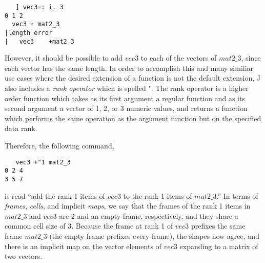 \begin{verbatim}
   ] vec3=: i. 3
0 1 2
  vec3 + mat2_3
|length error
|   vec3    +mat2_3
\end{verbatim}

However, it should be possible to add $vec3$ to each of the vectors of $mat2\_3$, since each vector has the same length.
In order to accomplish this and many similiar use cases where the desired extension of a function is not the default extension, 
J also includes a \textit{rank operator} which is spelled \ttfamily"\normalfont.
The rank operator is a higher order function which takes as its first argument a regular function 
and as its second argument a vector of 1, 2, or 3 numeric values, 
and returns a function which performs the same operation as the argument function but on the specified data rank.\cite{rankanduni}

Therefore, the following command, 

\begin{verbatim}
   vec3 +"1 mat2_3
0 2 4
3 5 7
\end{verbatim}

is read ``add the rank 1 items of $vec3$ to the rank 1 items of $mat2\_3$.''
In terms of \textit{frames}, \textit{cells}, and implicit \textit{maps}, we say that
the frames of the rank 1 items in $mat2\_3$ and $vec3$ are $2$ and an empty frame, respectively, and they share a common cell size of $3$.
Because the frame at rank 1 of $vec3$ prefixes the same frame $mat2\_3$ (the empty frame prefixes every frame), 
the shapes now agree, and there is an implicit map on the vector elements of $vec3$ expanding to a matrix of two vectors.

